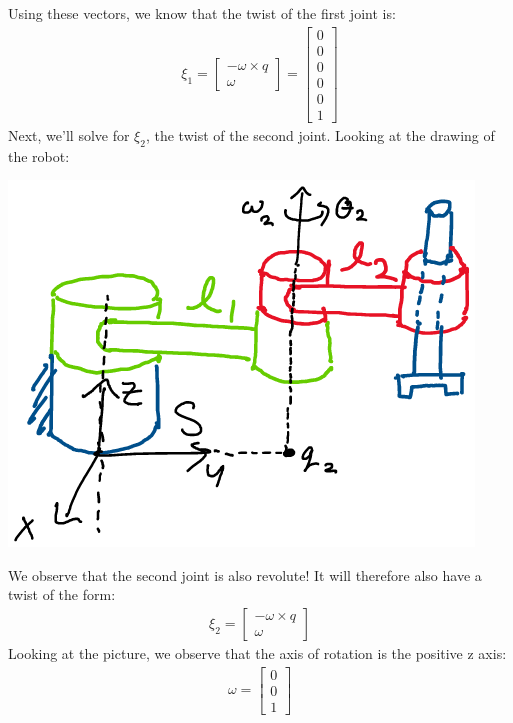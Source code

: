\documentclass[oneside]{book}
\begin{document}
Using these vectors, we know that the twist of the first joint is:
\begin{align}
    \xi_1 = 
    \begin{bmatrix}
       -\omega \times q\\
       \omega
    \end{bmatrix}
    = 
    \begin{bmatrix}
       0\\
       0\\
       0\\
       0\\
       0\\
       1
    \end{bmatrix}
\end{align}
Next, we'll solve for $\xi_2$, the twist of the second joint. Looking at the drawing of the robot:
\begin{center}
    \includegraphics[scale=0.3]{images/joint2.png}
\end{center}
We observe that the second joint is also revolute! It will therefore also have a twist of the form:
\begin{align}
    \xi_2 = 
    \begin{bmatrix}
       -\omega \times q\\
       \omega
    \end{bmatrix}
\end{align}
Looking at the picture, we observe that the axis of rotation is the positive z axis:
\begin{align}
    \omega = 
    \begin{bmatrix}
       0\\
       0\\
       1
    \end{bmatrix}
\end{align}
\end{document}
